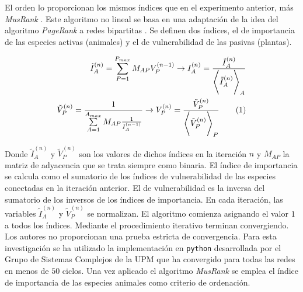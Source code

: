 El orden lo proporcionan los mismos índices que en el experimento anterior, más \textit{MusRank} \cite{dominguez2015ranking}. Este algoritmo no lineal se basa en una adaptación de la idea del algoritmo \textit{PageRank} a redes bipartitas \cite{tacchella2012new}. Se definen dos índices, el de importancia de las especies activas (animales) y el de vulnerabilidad de las pasivas (plantas).

\begin{align}
\tilde{I}^{(n)}_{A} =  \sum\limits_{P=1}^{{P}_{max}} {M}_{AP} {V}^{(n-1)}_{P} \rightarrow  {I}^{(n)}_{A} = \frac{\tilde{I}^{(n)}_{A}}{ {\Bigg \langle \tilde{I}^{(n)}_{A} \Bigg \rangle}_{A} }
\nonumber\\ 
\tilde{V}^{(n)}_{P} =  \frac{1}{\sum\limits_{A=1}^{{A}_{max}} {M}_{AP} \frac{1}{{I}^{(n-1)}_{A}} } \rightarrow  {V}^{(n)}_{P} = \frac{\tilde{V}^{(n)}_{P}}{ {\Bigg \langle \tilde{V}^{(n)}_{P} \Bigg \rangle}_{P} }
\stepcounter{equation}\tag{\theequation}\label{eq:DEST_MusRank}
\end{align}

Donde $\tilde{I}^{(n)}_{A}$ y $\tilde{V}^{(n)}_{P}$ son los valores de dichos índices en la iteración $n$ y ${M}_{AP}$ la matriz de adyacencia que se trata siempre como binaria. El índice de importancia se calcula como el sumatorio de los índices de vulnerabilidad de las especies conectadas en la iteración anterior. El de vulnerabilidad es la inversa del sumatorio de los inversos de los índices de importancia. En cada iteración, las variables $\tilde{I}^{(n)}_{A}$ y $\tilde{V}^{(n)}_{P}$ se normalizan. El algoritmo comienza asignando el valor $1$ a todos los índices. Mediante el procedimiento iterativo terminan convergiendo. Los autores no proporcionan una prueba estricta de convergencia. Para esta investigación se ha utilizado la implementación en \texttt{python} desarrollada por el Grupo de Sistemas Complejos de la UPM que ha convergido para todas las redes en menos de $50$ ciclos. Una vez aplicado el algoritmo \textit{MusRank} se emplea el índice de importancia de las especies animales como criterio de ordenación.

